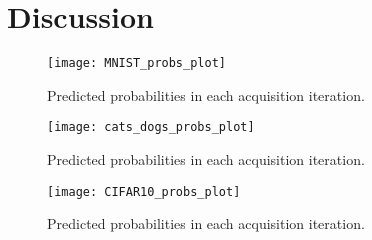 \section{Discussion}


\begin{figure}[H]
    \centering
    \texttt{[image: MNIST\_probs\_plot]}
    \caption{Predicted probabilities in each acquisition iteration.}
    \label{fig:MNIST_probs_plot}
\end{figure}


\begin{figure}[H]
    \centering
    \texttt{[image: cats\_dogs\_probs\_plot]}
    \caption{Predicted probabilities in each acquisition iteration.}
    \label{fig:cats_dogs_probs_plot}
\end{figure}


\begin{figure}[H]
    \centering
    \texttt{[image: CIFAR10\_probs\_plot]}
    \caption{Predicted probabilities in each acquisition iteration.}
    \label{fig:CIFAR10_probs_plot}
\end{figure}


